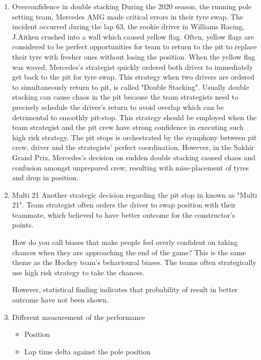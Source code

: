 \begin{enumerate}
\setlength\parskip{1em}
\setlength\itemsep{1em}
    
    \item Overconfidence in double stacking
    During the 2020 season, the running pole setting team, Mercedes AMG  made critical
    errors in their tyre swap. The incident occurred during the lap 63, the rookie driver
    in Williams Racing, J.Aitken crushed into a wall which caused yellow flag. Often,
    yellow flags are considered to be perfect opportunities for team to return to the
    pit to replace their tyre with fresher ones without losing the position. When the
    yellow flag was waved, Mercedes's strategist quickly ordered both driver to
    immediately get back to the pit for tyre swap. This strategy when two drivers are
    ordered to simultaneously return to pit, is called "Double Stacking". Usually double
    stacking can cause chaos in the pit because the team strategists need to precisely
    schedule the driver's return to avoid overlap which can be detrimental to  smoothly
    pit-stop. This strategy should be employed when the team strategist and the pit crew
    have strong confidence in executing such high risk strategy. The pit stops is
    orchestrated by the symphony between pit crew, driver and the strategists' perfect
    coordination. However, in the Sakhir Grand Prix, Mercedes's decision on sudden
    double stacking caused chaos and confusion amongst unprepared crew, resulting with
    miss-placement of tyres and drop in position. 
    
    \item Multi 21 
    Another strategic decision regarding the pit stop in known as "Multi 21". Team
    strategist often orders the driver to swap position with their teammate, which
    believed to have better outcome for the constructor's points.

    How do you call biases that make people feel overly confident on taking chances when
    they are approaching the end of the game? This is the same theme as the Hockey
    team's behavioural biases. The teams often strategically use high risk strategy to
    take the chances. \citep{asness2018pulling}
    
    However, statistical finding indicates that  probability of result in better outcome
    have not been shown. 
    
    \item Different measurement of the performance 
    \begin{itemize}
        \item Position 
        \item Lap time delta against the pole position 
    \end{itemize}
    
\end{enumerate}

